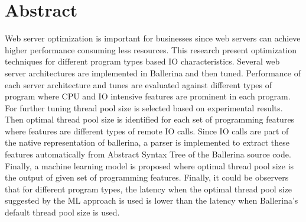 \chapter*{Abstract}

Web server optimization is important for businesses since web servers can achieve higher performance consuming less resources. This research present optimization techniques for different program types based IO characteristics. Several web server architectures are implemented in Ballerina and then tuned. Performance of each server architecture and tunes are evaluated against different types of program where CPU and IO intensive features are prominent in each program. For further tuning thread pool size is selected based on experimental results. Then optimal thread pool size is identified for each set of programming features where features are different types of remote IO calls. Since IO calls are part of the native representation of ballerina, a parser is implemented to extract these features automatically from Abstract Syntax Tree of the Ballerina source code. Finally, a machine learning model is proposed where optimal thread pool size is the output of given set of programming features. Finally, it could be observers that for different program types, the latency when the optimal thread pool size suggested by the ML approach is used is lower than the latency when Ballerina's default thread pool size is used.
